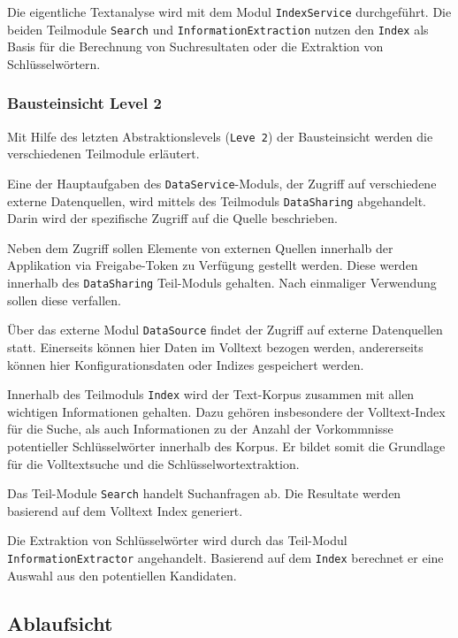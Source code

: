 Die eigentliche Textanalyse wird mit dem Modul \texttt{IndexService} durch\-ge\-führt. Die beiden Teilmodule \texttt{Search} und \texttt{InformationExtraction} nutzen den \texttt{Index} als Basis für die Berechnung von Suchresultaten oder die Extraktion von Schlüsselwörtern.

\subsubsection{Bausteinsicht Level 2}
Mit Hilfe des letzten Abstraktionslevels (\texttt{Leve 2}) der Bausteinsicht werden die verschiedenen Teilmodule erläutert.

Eine der Hauptaufgaben des \texttt{DataService}-Moduls, der Zugriff auf verschiedene externe Datenquellen, wird mittels des Teilmoduls \texttt{Data\-Sharing} abgehandelt. Darin wird der spezifische Zugriff auf die Quelle beschrieben.

Neben dem Zugriff sollen Elemente von externen Quellen innerhalb der Applikation via Freigabe-Token zu Verfügung gestellt werden. Diese werden innerhalb des \texttt{DataSharing} Teil-Moduls gehalten. Nach einmaliger Verwendung sollen diese verfallen.

Über das externe Modul \texttt{DataSource} findet der Zugriff auf externe Datenquellen statt. Einerseits können hier Daten im Volltext bezogen werden, andererseits können hier Konfigurationsdaten oder Indizes gespeichert werden.

Innerhalb des Teilmoduls \texttt{Index} wird der Text-Korpus zusammen mit allen wichtigen Informationen gehalten. Dazu gehören insbesondere der Volltext-Index für die Suche, als auch Informationen zu der Anzahl der Vorkommnisse potentieller Schlüsselwörter innerhalb des Korpus. Er bildet somit die Grundlage für die Volltextsuche und die Schlüsselwortextraktion.

Das Teil-Module \texttt{Search} handelt Suchanfragen ab. Die Resultate werden basierend auf dem Volltext Index generiert. 

Die Extraktion von Schlüsselwörter wird durch das Teil-Modul \texttt{In\-for\-ma\-tion\-Ex\-trac\-tor} angehandelt. Basierend auf dem \texttt{Index} berechnet er eine Auswahl aus den potentiellen Kandidaten.

\newpage

\subsection{Ablaufsicht}

